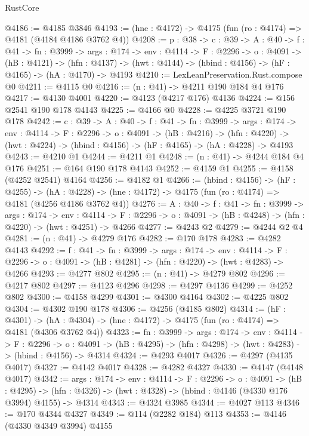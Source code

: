 \begin{lexlean}{RustCore}
\begin{coremodule}
@4186 := @4185 @3846
@4193 := (hne : @4172) -> @4175 (fun (ro : @4174) => @4181 (@4184 @4186 @3762 @4))
@4208 := {p : @38} ->
  {c : @39} ->
  {A : @40} ->
  {f : @41} ->
  {fn : @3999} ->
  {args : @174} ->
  {env : @4114} ->
  {F : @2296} ->
  {o : @4091} ->
  (hB : @4121) ->
  (hfn : @4137) -> (hwt : @4144) -> (hbind : @4156) -> (hF : @4165) -> (hA : @4170) -> @4193
@4210 := LexLeanPreservation.Rust.compose @0
@4211 := @4115 @0
@4216 := (n : @41) -> @4211 @190 @184 @4 @176
@4217 := @4130 @4001
@4220 := @4123 (@4217 @176) @4136
@4224 := @156 @2541 @190 @178 @4143
@4225 := @4166 @0
@4228 := @4225 @3721 @190 @178
@4242 := {c : @39} ->
  {A : @40} ->
  {f : @41} ->
  {fn : @3999} ->
  {args : @174} ->
  {env : @4114} ->
  {F : @2296} ->
  {o : @4091} ->
  (hB : @4216) ->
  (hfn : @4220) -> (hwt : @4224) -> (hbind : @4156) -> (hF : @4165) -> (hA : @4228) -> @4193
@4243 := @4210 @1
@4244 := @4211 @1
@4248 := (n : @41) -> @4244 @184 @4 @176
@4251 := @164 @190 @178 @4143
@4252 := @4159 @1
@4255 := @4158 (@4252 @2541) @4164
@4256 := @4182 @1
@4266 := (hbind : @4156) ->
  (hF : @4255) ->
  (hA : @4228) -> (hne : @4172) -> @4175 (fun (ro : @4174) => @4181 (@4256 @4186 @3762 @4))
@4276 := {A : @40} ->
  {f : @41} ->
  {fn : @3999} ->
  {args : @174} ->
  {env : @4114} ->
  {F : @2296} -> {o : @4091} -> (hB : @4248) -> (hfn : @4220) -> (hwt : @4251) -> @4266
@4277 := @4243 @2
@4279 := @4244 @2 @4
@4281 := (n : @41) -> @4279 @176
@4282 := @170 @178
@4283 := @4282 @4143
@4292 := {f : @41} ->
  {fn : @3999} ->
  {args : @174} ->
  {env : @4114} ->
  {F : @2296} -> {o : @4091} -> (hB : @4281) -> (hfn : @4220) -> (hwt : @4283) -> @4266
@4293 := @4277 @802
@4295 := (n : @41) -> @4279 @802
@4296 := @4217 @802
@4297 := @4123 @4296
@4298 := @4297 @4136
@4299 := @4252 @802
@4300 := @4158 @4299
@4301 := @4300 @4164
@4302 := @4225 @802
@4304 := @4302 @190 @178
@4306 := @4256 (@4185 @802)
@4314 := (hF : @4301) ->
  (hA : @4304) -> (hne : @4172) -> @4175 (fun (ro : @4174) => @4181 (@4306 @3762 @4))
@4323 := {fn : @3999} ->
  {args : @174} ->
  {env : @4114} ->
  {F : @2296} ->
  {o : @4091} -> (hB : @4295) -> (hfn : @4298) -> (hwt : @4283) -> (hbind : @4156) -> @4314
@4324 := @4293 @4017
@4326 := @4297 (@4135 @4017)
@4327 := @4142 @4017
@4328 := @4282 @4327
@4330 := @4147 (@4148 @4017)
@4342 := {args : @174} ->
  {env : @4114} ->
  {F : @2296} ->
  {o : @4091} ->
  (hB : @4295) ->
  (hfn : @4326) -> (hwt : @4328) -> (hbind : @4146 (@4330 @176 @3994) @4155) -> @4314
@4343 := @4324 @3985
@4344 := @4027 @113
@4346 := @170 @4344 @4327
@4349 := @114 (@2282 @184) @113
@4353 := @4146 (@4330 @4349 @3994) @4155

\end{coremodule}
\end{lexlean}
